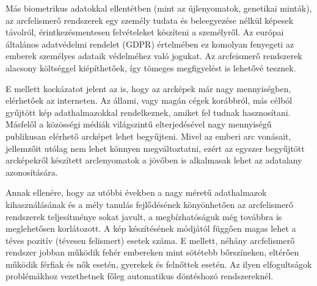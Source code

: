 Más biometrikus adatokkal ellentétben (mint az újlenyomatok, genetikai minták), az arcfelismerő rendszerek egy személy tudata és beleegyezése nélkül képesek távolról, érintkezésmentesen felvételeket készíteni a személyről. Az európai általános adatvédelmi rendelet (GDPR) értelmében ez komolyan fenyegeti az emberek személyes adataik védelméhez való jogukat. Az arcfeismerő rendszerek alacsony költséggel kiépíthetőek, így tömeges megfigyelést is lehetővé tesznek. 

E mellett kockázatot jelent az is, hogy az arcképek már nagy mennyiségben, elérhetőek az interneten. Az állami, vagy magán cégek korábbról, más célból gyűjtött kép adathalmazokkal rendelkeznek, amiket fel tudnak hasznosítani. Másfelől a közösségi médiák világszintű elterjedésével nagy mennyiségű publikusan elérhető arcképet lehet begyűjteni. Mivel az emberi arc vonásait, jellemzőit utólag nem lehet könnyen megváltoztatni, ezért az egyszer begyűjtött arcképekről készített arclenyomatok a jövőben is alkalmasak lehet az adatalany azonosítására.

Annak ellenére, hogy az utóbbi években a nagy méretű adathalmazok kihasználásának és a mély tanulás fejlődésének könyönhetően az arcfelismerő rendszerek teljesítménye sokat javult, a megbízhatóságuk még továbbra is meglehetősen korlátozott. A kép készítésének módjától függően magas lehet a téves pozitív (tévesen felismert) esetek száma. E mellett, néhány arcfelismerő rendszer jobban működik fehér embereken mint sötétebb bőrszíneken, eltérően működik férfiak és nők esetén, gyerekek és felnőttek esetén. Az ilyen elfogultságok problémákhoz vezethetnek főleg automatikus döntéshozó rendszereknél.





